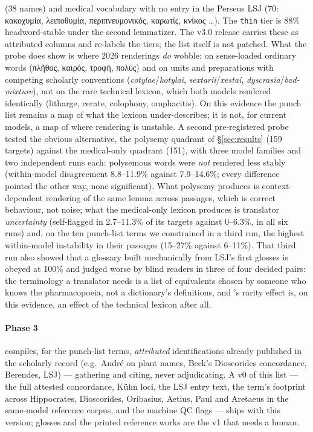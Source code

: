 \documentclass[11pt]{article}
\begin{document}
(38 names) and medical vocabulary with no entry in the Perseus LSJ (70: κακοχυμία, λειποθυμία,
περιπνευμονικός, καρωτίς, κνίκος \ldots). The \texttt{thin} tier is 88\% headword-stable under the
second lemmatizer. The v3.0 release carries these as attributed columns and re-labels the tiers; the
list itself is not patched. What the probe does show is where 2026 renderings \emph{do} wobble: on sense-loaded
ordinary words (πλῆθος, καιρός, τροφή, πολύς) and on units and preparations with competing
scholarly conventions (\textit{cotylae}/\textit{kotylai}, \textit{sextarii}/\textit{xestai},
\textit{dyscrasia}/\textit{bad-mixture}), not on the rare technical lexicon, which both models
rendered identically (litharge, cerate, colophony, omphacitis). On this evidence the punch list
remains a map of what the lexicon under-describes; it is not, for current models, a map of where
rendering is unstable. A second pre-registered probe tested the obvious alternative, the polysemy
quadrant of \S\ref{sec:results} (159 targets) against the medical-only quadrant (151), with three model
families and two independent runs each: polysemous words were \emph{not} rendered less stably
(within-model disagreement 8.8--11.9\% against 7.9--14.6\%; every difference pointed the other way, none
significant). What polysemy produces is context-dependent rendering of the same lemma across passages,
which is correct behaviour, not noise; what the medical-only lexicon produces is translator
\emph{uncertainty} (self-flagged in 2.7--11.3\% of its targets against 0--6.3\%, in all six runs) and,
on the ten punch-list terms we constrained in a third run, the highest within-model instability in their
passages (15--27\% against 6--11\%). That third run also showed that a glossary built mechanically from
LSJ's first glosses is obeyed at 100\% and judged worse by blind readers in three of four decided pairs:
the terminology a translator needs is a list of equivalents chosen by someone who knows the
pharmacopoeia, not a dictionary's definitions, and \citet{galen-mt-mqm-2026}'s rarity effect is, on this
evidence, an effect of the technical lexicon after all.

\paragraph{Phase 3}
compiles, for the punch-list terms, \textit{attributed} identifications already published in the
scholarly record (e.g.\ André on plant names, Beck's Dioscorides concordance, Berendes, LSJ) ---
gathering and citing, never adjudicating. A v0 of this list --- the full attested concordance,
K\"uhn loci, the LSJ entry text, the term's footprint across Hippocrates, Dioscorides, Oribasius,
Aetius, Paul and Aretaeus in the same-model reference corpus, and the machine QC flags --- ships
with this version; glosses and the printed reference works are the v1 that needs a human.
\end{document}
